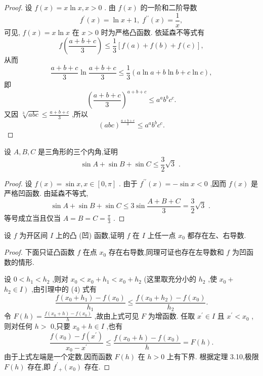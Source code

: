 \begin{proof}
设 \(f\left( x\right)  = x\ln x,x > 0\) . 由 \(f\left( x\right)\) 的一阶和二阶导数
\[
{f}^{\prime }\left( x\right)  = \ln x + 1,\;{f}^{\prime \prime }\left( x\right)  = \frac{1}{x},
\]
可见, \(f\left( x\right)  = x\ln x\) 在 \(x > 0\) 时为严格凸函数. 依延森不等式有
\[
f\left( \frac{a + b + c}{3}\right)  \leq  \frac{1}{3}\left\lbrack  {f\left( a\right)  + f\left( b\right)  + f\left( c\right) }\right\rbrack  ,
\]
从而
\[
\frac{a + b + c}{3}\ln \frac{a + b + c}{3} \leq  \frac{1}{3}\left( {a\ln a + b\ln b + c\ln c}\right) ,
\]
即
\[
{\left( \frac{a + b + c}{3}\right) }^{a + b + c} \leq  {a}^{a}{b}^{b}{c}^{c}.
\]
又因 \(\sqrt[3]{abc} \leq  \frac{a + b + c}{3}\) ,所以
\[
{\left( abc\right) }^{\frac{a + b + c}{3}} \leq  {a}^{a}{b}^{b}{c}^{c}.
\]
\end{proof}

\begin{example}
设 \(A,B,C\) 是三角形的三个内角,证明
\[
\sin A + \sin B + \sin C \leq  \frac{3}{2}\sqrt{3}\text{ . }
\]
\end{example}

\begin{proof}
设 \(f\left( x\right)  = \sin x,x \in  \left\lbrack  {0,\pi }\right\rbrack\) . 由于 \({f}^{\prime \prime }\left( x\right)  =  - \sin x < 0\) ,因而 \(f\left( x\right)\) 是严格凹函数. 由延森不等式,
\[
\sin A + \sin B + \sin C \leq  3\sin \frac{A + B + C}{3} = \frac{3}{2}\sqrt{3}\text{ . }
\]
等号成立当且仅当 \(A = B = C = \frac{\pi }{3}\) .
\end{proof}


\begin{example}
设 \(f\) 为开区间 \(I\) 上的凸 (凹) 函数,证明 \(f\) 在 \(I\) 上任一点 \({x}_{0}\) 都存在左、右导数.
\end{example}


\begin{proof}
下面只证凸函数 \(f\) 在点 \({x}_{0}\) 存在右导数,同理可证也存在左导数和 \(f\) 为凹函数的情形.

设 \(0 < {h}_{1} < {h}_{2}\) ,则对 \({x}_{0} < {x}_{0} + {h}_{1} < {x}_{0} + {h}_{2}\) (这里取充分小的 \({h}_{2}\) ,使 \({x}_{0} +\)  \(\left. {{h}_{2} \in  I}\right)\) ,由引理中的 (4) 式有
\[
\frac{f\left( {{x}_{0} + {h}_{1}}\right)  - f\left( {x}_{0}\right) }{{h}_{1}} \leq  \frac{f\left( {{x}_{0} + {h}_{2}}\right)  - f\left( {x}_{0}\right) }{{h}_{2}}.
\]
令 \(F\left( h\right)  = \frac{f\left( {{x}_{0} + h}\right)  - f\left( {x}_{0}\right) }{h}\) ,故由上式可见 \(F\) 为增函数. 任取 \({x}^{\prime } \in  I\) 且 \({x}^{\prime } < {x}_{0}\) ,则对任何 \(h >\) 0,只要 \({x}_{0} + h \in  I\) ,也有
\[
\frac{f\left( {x}_{0}\right)  - f\left( {x}^{\prime }\right) }{{x}_{0} - {x}^{\prime }} \leq  \frac{f\left( {{x}_{0} + h}\right)  - f\left( {x}_{0}\right) }{h} = F\left( h\right) .
\]
由于上式左端是一个定数,因而函数 \(F\left( h\right)\) 在 \(h > 0\) 上有下界. 根据定理 3.10,极限 \(F\left( h\right)\) 存在,即 \({f}^{\prime }{}_{ + }\left( {x}_{0}\right)\) 存在.
\end{proof}


